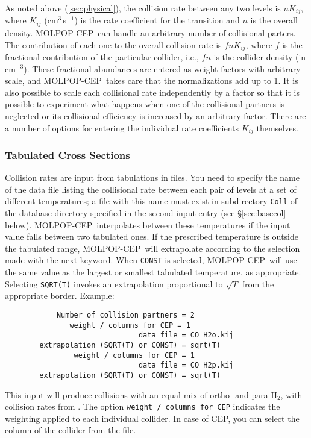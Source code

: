 \documentclass[12pt]{article}
\def\separation {0.5cm}
\def\M{MOLPOP-CEP}
\begin{document}
As noted above (\ref{sec:physical}), the collision rate between any two levels
is $nK_{ij}$, where $K_{ij}$ (cm$^3$\,s$^{-1}$) is the rate coefficient for the
transition and $n$ is the overall density. \M\ can handle an arbitrary number
of collisional parters. The contribution of each one to the overall collision
rate is $fnK_{ij}$, where $f$ is the fractional contribution of the particular
collider, i.e., $fn$ is the collider density (in cm$^{-3}$). These fractional
abundances are entered as weight factors with arbitrary scale, and \M\ takes
care that the normalizations add up to 1. It is also possible to scale each
collisional rate independently by a factor so that it is possible to experiment
what happens when one of the collisional partners is neglected or its
collisional efficiency is increased by an arbitrary factor. There are a number
of options for entering the individual rate coefficients $K_{ij}$ themselves.


\subsubsection{Tabulated Cross Sections}

Collision rates are input from tabulations in files. You need to specify
the name of the data file listing the collisional rate between each pair of
levels at a set of different temperatures; a file with this name must exist in
subdirectory {\tt Coll} of the database directory specified in the second input
entry (see \S\ref{sec:basecol} below). \M\ interpolates between these temperatures if the
input value falls between two tabulated ones. If the prescribed temperature is
outside the tabulated range, \M\ will extrapolate according to the selection
made with the next keyword. When \texttt{CONST} is selected, \M\ will use the
same value as the largest or smallest tabulated temperature, as appropriate.
Selecting \texttt{SQRT(T)} invokes an extrapolation proportional to $\sqrt{T}$
from the appropriate border. Example:

\vspace{\separation}
\begin{verbatim}
            Number of collision partners = 2
               weight / columns for CEP = 1
                               data file = CO_H2o.kij
        extrapolation (SQRT(T) or CONST) = sqrt(T)
                weight / columns for CEP = 1
                               data file = CO_H2p.kij
        extrapolation (SQRT(T) or CONST) = sqrt(T)
\end{verbatim}
This input will produce collisions with an equal mix of ortho- and para-H$_2$,
with collision rates from \cite{flower01}. The option \texttt{weight / columns for CEP}
indicates the weighting applied to each individual collider. In case of CEP, you can
select the column of the collider from the file.
\end{document}
